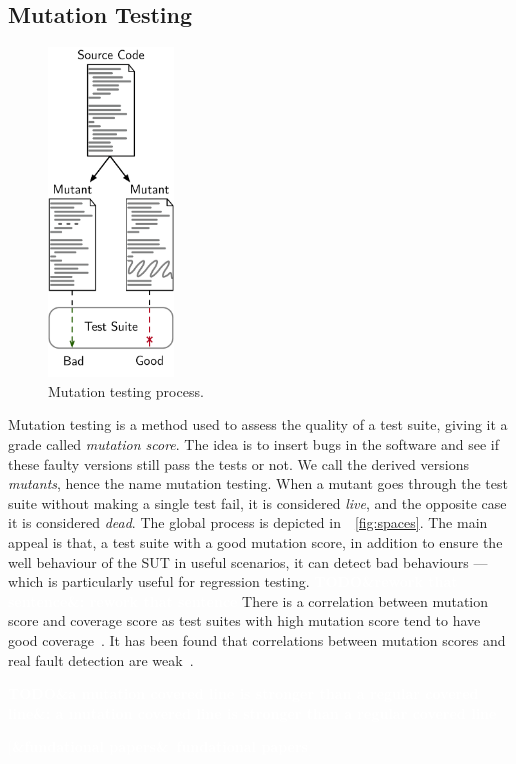 \documentclass[11pt]{sdm_internship}
\newcommand{\addref}[1]{\colorbox{TealBlue!100}{\textcolor{white}{\textbf{$[$\ifx&#1&\ \else#1\fi$]$}}}}
\newcommand{\todo}[1]{\colorbox{Red!75}{\textcolor{white}{\textbf{TODO\ifx&#1&\else: #1\fi}}}}
\theoremstyle{definition}
\begin{document}
\subsection{Mutation Testing}%
\label{ssec:mutation_testing}
\begin{figure}
  \centering
  \includegraphics[width=9em]{mutation_testing_report}
  \caption{Mutation testing process.}%
\label{fig:mutation_testing}
\end{figure}
Mutation testing is a method used to assess the quality of a test suite, giving it a grade called \textit{mutation score}.
The idea is to insert bugs in the software and see if these faulty versions still pass the tests or not.
We call the derived versions \textit{mutants}, hence the name mutation testing.
When a mutant goes through the test suite without making a single test fail, it is considered \emph{live}, and the opposite case it is considered \emph{dead}.
The global process is depicted in~\figurename~\ref{fig:spaces}.
The main appeal is that, a test suite with a good mutation score, in addition to ensure the well behaviour of the SUT in useful scenarios, it can detect bad behaviours --- which is particularly useful for regression testing.
\todo{rework that sentence}
There is a correlation between mutation score and coverage score as test suites with high mutation score tend to have good coverage~\cite{assylbekov2013investigating}.
It has been found that correlations between mutation scores and real fault detection are weak~\cite{papadakis2018mutation,just2014mutants}.

\todo{a mutation covered line is stronger than a regular covered line}

\addref{fundational papers}
\end{document}
